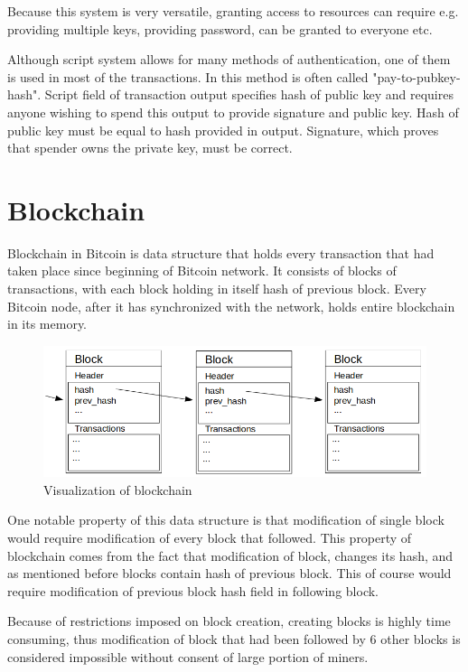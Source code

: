\documentclass[12pt, en, eng, oneside, final]{mgr}
\begin{document}
Because this system is very versatile, granting access to resources can require e.g. providing multiple keys, providing password, can be granted to everyone etc. 

Although script system allows for many methods of authentication, one of them is used in most of the transactions. In this method is often called "pay-to-pubkey-hash". Script field of transaction output specifies hash of public key and requires anyone wishing to spend this output to provide signature and public key. Hash of public key must be equal to hash provided in output. Signature, which proves that spender owns the private key, must be correct.


\section{Blockchain}
Blockchain in Bitcoin is data structure that holds every transaction that had taken place since beginning of Bitcoin network. It consists of blocks of transactions, with each block holding in itself hash of previous block. Every Bitcoin node, after it has synchronized with the network, holds entire blockchain in its memory.

\begin{figure}[H]
  \includegraphics[width=0.8\linewidth]{blockchain.png}
  \caption{Visualization of blockchain}
  \label{fig:visualization-of-blockchain}
\end{figure}

One notable property of this data structure is that modification of single block would require modification of every block that followed. This property of blockchain comes from the fact that modification of block, changes its hash, and as mentioned before blocks contain hash of previous block. This of course would require modification of previous block hash field in following block. 

Because of restrictions imposed on block creation, creating blocks is highly time consuming, thus modification of block that had been followed by 6 other blocks is considered impossible without consent of large portion of miners.
\end{document}
